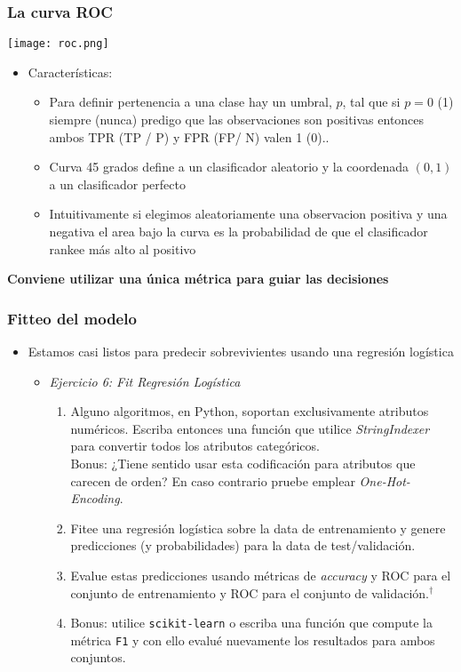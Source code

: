 \documentclass[leqno, 10pt, envcountsect]{beamer}
\numberwithin{equation}{section}
\theoremstyle{definition}
\theoremstyle{example}
\numberwithin{figure}{section}
\numberwithin{table}{section}
\let\olditem\item
\renewcommand{\item}{%
\olditem\vspace{1pt}}
\begin{document}
\begin{frame}[fragile=singleslide]
  \frametitle{La curva ROC}
  \begin{center}
    \texttt{[image: roc.png]}
  \end{center}
  \begin{itemize}
    \item Características:
      \begin{itemize}
        \item Para definir pertenencia a una clase hay un umbral, $p$, tal que
          si $p=0$ (1) siempre (nunca) predigo que las observaciones son
          positivas entonces ambos TPR (TP / P) y FPR (FP/ N) valen 1 (0)..
        \item Curva 45 grados define a un clasificador aleatorio y la
          coordenada $(0,1)$ a un clasificador perfecto
        \item Intuitivamente si elegimos aleatoriamente una observacion
          positiva y una negativa el area bajo la curva es la probabilidad de
          que el clasificador rankee más alto al positivo
      \end{itemize}
  \end{itemize}

  \textbf{Conviene utilizar una única métrica para guiar las decisiones}
\end{frame}
\begin{frame}[fragile=singleslide]
  \frametitle{Fitteo del modelo}
  \begin{itemize}
    \item Estamos casi listos para predecir sobrevivientes usando una regresión
      logística
      \begin{itemize}
        \item \textit{Ejercicio 6: Fit Regresión Logística}
          \begin{enumerate}
            \item Alguno algoritmos, en Python, soportan exclusivamente
              atributos numéricos.
              Escriba entonces una función que utilice \textit{StringIndexer} para
              convertir todos los atributos categóricos.\\
              Bonus: ¿Tiene sentido usar esta codificación para
                atributos que carecen de orden? En caso contrario pruebe
                emplear \textit{One-Hot-Encoding}.
            \item Fitee una regresión logística sobre la data de entrenamiento y
              genere predicciones (y probabilidades) para la data de test/validación.
            \item Evalue estas predicciones usando métricas
              de \textit{accuracy} y ROC para el conjunto de entrenamiento y ROC
              para el conjunto de validación.$^{\dag}$
            \item Bonus: utilice \texttt{scikit-learn} o escriba una función
              que compute la métrica \texttt{F1} y con ello evalué nuevamente
              los resultados para ambos conjuntos.
          \end{enumerate}
      \end{itemize}
  \end{itemize}
\end{frame}
\end{document}
